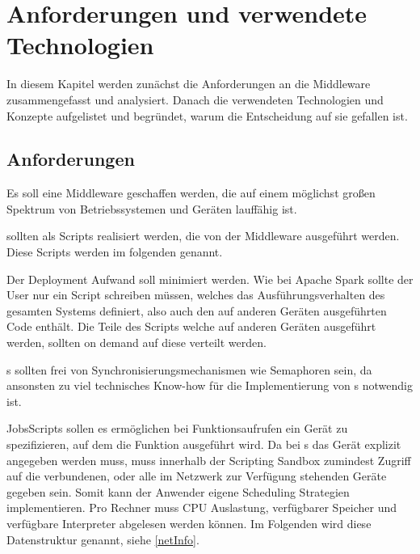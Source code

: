 
\chapter{Anforderungen und verwendete Technologien}
\label{K3}
In diesem Kapitel werden zunächst die Anforderungen an die Middleware zusammengefasst und analysiert.
Danach die verwendeten Technologien und Konzepte aufgelistet und begründet, warum die Entscheidung auf sie gefallen ist.



\section{Anforderungen}

\BCL
  \item Es soll eine Middleware geschaffen werden, die auf einem möglichst großen Spektrum von Betriebssystemen und Geräten lauffähig ist.

  \item \ApplicationLayer{} sollten als Scripts realisiert werden, die von der Middleware ausgeführt werden.
  Diese Scripts werden im folgenden \jobScript{} genannt.

  \item Der Deployment Aufwand soll minimiert werden.
  Wie bei Apache Spark sollte der User nur ein Script schreiben müssen, welches das Ausführungsverhalten des gesamten Systems definiert, also auch den auf anderen Geräten ausgeführten Code enthält.
  Die Teile des Scripts welche auf anderen Geräten ausgeführt werden, sollten on demand auf diese verteilt werden.

  \item  \jobScript s sollten frei von Synchronisierungsmechanismen wie Semaphoren sein, da ansonsten zu viel technisches Know-how für die Implementierung von \jobScript s notwendig ist.

  \item JobsScripts sollen es ermöglichen bei Funktionsaufrufen ein Gerät zu spezifizieren, auf dem die Funktion ausgeführt wird.
  Da bei \remoteJob s das Gerät explizit angegeben werden muss, muss innerhalb der Scripting Sandbox zumindest Zugriff auf die verbundenen,
  oder alle im Netzwerk zur Verfügung stehenden Geräte gegeben sein.
  Somit kann der Anwender eigene Scheduling Strategien implementieren.
  Pro Rechner muss CPU Auslastung, verfügbarer Speicher und verfügbare Interpreter abgelesen werden können.
  Im Folgenden wird diese Datenstruktur \netInfo{} genannt, siehe \ref{netInfo}.

